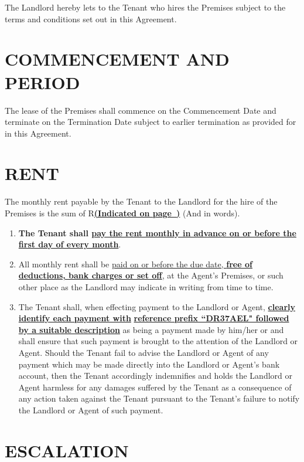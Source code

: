 \documentclass[11pt]{article}
\begin{document}
The Landlord hereby lets to the Tenant who hires the Premises subject to the terms and conditions set out in this Agreement.

\section{\uppercase{commencement and period}}

The lease of the Premises shall commence on the Commencement Date and terminate on the Termination Date subject to earlier termination as provided for in this Agreement.

\section{\uppercase{rent}}

The monthly rent payable by the Tenant to the Landlord for the hire of the Premises is the sum of R\underline{\textbf{(Indicated on page~\pageref{input:rent-amount})}} (And in words).
\begin{enumerate}
	\item \textbf{The Tenant shall \underline{pay the rent monthly in advance on or before the first day of every month}}.
	\item All monthly rent shall be \underline{paid on or before the due date, \textbf{free of deductions, bank charges or set off}}, at the Agent's Premises, or such other place as the Landlord may indicate in writing from time to time.
	\item The Tenant shall, when effecting payment to the Landlord or Agent, \textbf{\underline{clearly identify each payment with}} \textbf{\underline{reference prefix ``DR37AEL" followed by a suitable description}} as being a payment made by him/her or and shall ensure that such payment is brought to the attention of the Landlord or Agent. Should the Tenant fail to advise the Landlord or Agent of any payment which may be made directly into the Landlord or Agent's bank account, then the Tenant accordingly indemnifies and holds the Landlord or Agent harmless for any damages suffered by the Tenant as a consequence of any action taken against the Tenant pursuant to the Tenant's failure to notify the Landlord or Agent of such payment.
\end{enumerate}

\section{\uppercase{escalation}}
\end{document}
